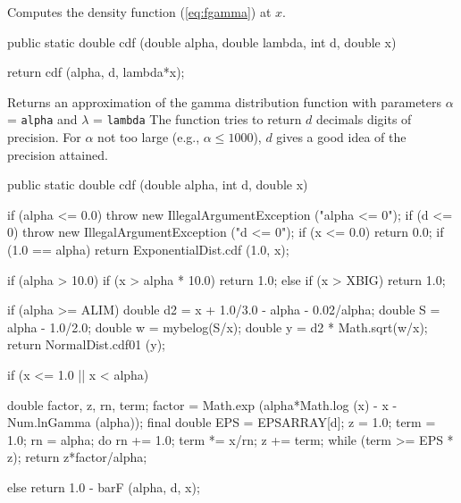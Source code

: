 \begin{tabb} Computes the density function (\ref{eq:fgamma}) at $x$.
\end{tabb}
\begin{code}

   public static double cdf (double alpha, double lambda, int d, double x)\begin{hide} {
      return cdf (alpha, d, lambda*x);
   }\end{hide}
\end{code}
\begin{tabb} Returns an approximation of the gamma distribution
function with  parameters $\alpha$ = \texttt{alpha} and
$\lambda$ = \texttt{lambda}
 The function tries to return $d$ decimals digits of precision.
 For $\alpha$ not too large (e.g., $\alpha \le 1000$),
 $d$ gives a good idea of the precision attained.
\end{tabb}
\begin{code}

   public static double cdf (double alpha, int d, double x)\begin{hide} {
      if (alpha <= 0.0)
        throw new IllegalArgumentException ("alpha <= 0");
      if (d <= 0)
        throw new IllegalArgumentException ("d <= 0");
      if (x <= 0.0)
         return 0.0;
      if (1.0 == alpha)
         return ExponentialDist.cdf (1.0, x);

      if (alpha > 10.0) {
         if (x > alpha * 10.0)
            return 1.0;
      } else {
         if (x > XBIG)
            return 1.0;
      }

      if (alpha >= ALIM) {
         double d2 = x + 1.0/3.0 - alpha - 0.02/alpha;
         double S = alpha - 1.0/2.0;
         double w = mybelog(S/x);
         double y = d2 * Math.sqrt(w/x);
         return NormalDist.cdf01 (y);
      }

      if (x <= 1.0 || x < alpha) {
         double factor, z, rn, term;
         factor = Math.exp (alpha*Math.log (x) - x - Num.lnGamma (alpha));
         final double EPS = EPSARRAY[d];
         z = 1.0;
         term = 1.0;
         rn = alpha;
         do {
            rn += 1.0;
            term *= x/rn;
            z += term;
         } while (term >= EPS * z);
         return z*factor/alpha;

      } else
         return 1.0 - barF (alpha, d, x);
   }\end{hide}
\end{code}
